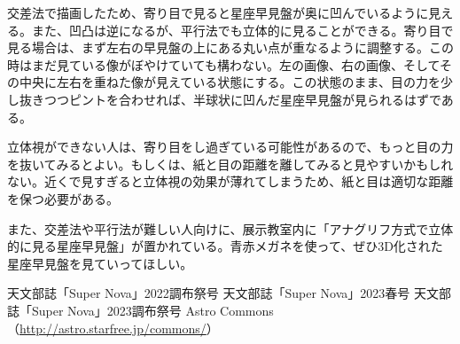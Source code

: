 \documentclass[../main]{subfiles}
\begin{document}
交差法で描画したため、寄り目で見ると星座早見盤が奥に凹んでいるように見える。また、凹凸は逆になるが、平行法でも立体的に見ることができる。寄り目で見る場合は、まず左右の早見盤の上にある丸い点が重なるように調整する。この時はまだ見ている像がぼやけていても構わない。左の画像、右の画像、そしてその中央に左右を重ねた像が見えている状態にする。この状態のまま、目の力を少し抜きつつピントを合わせれば、半球状に凹んだ星座早見盤が見られるはずである。

立体視ができない人は、寄り目をし過ぎている可能性があるので、もっと目の力を抜いてみるとよい。もしくは、紙と目の距離を離してみると見やすいかもしれない。近くで見すぎると立体視の効果が薄れてしまうため、紙と目は適切な距離を保つ必要がある。

また、交差法や平行法が難しい人向けに、展示教室内に「アナグリフ方式で立体的に見る星座早見盤」が置かれている。青赤メガネを使って、ぜひ3D化された星座早見盤を見ていってほしい。

\begin{thebibliography}{99}
   天文部誌「Super Nova」2022調布祭号
   天文部誌「Super Nova」2023春号
   天文部誌「Super Nova」2023調布祭号
   Astro Commons （\url{http://astro.starfree.jp/commons/}）
\end{thebibliography}
\end{document}
